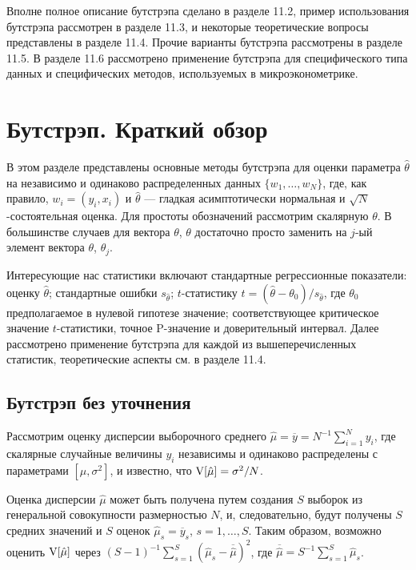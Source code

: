 Вполне полное описание бутстрэпа сделано в разделе 11.2, пример использования бутстрэпа рассмотрен в разделе 11.3, и некоторые теоретические вопросы представлены в разделе 11.4. Прочие варианты бутстрэпа рассмотрены в разделе 11.5. В разделе 11.6 рассмотрено применение бутстрэпа для специфического типа данных и специфических методов, используемых в микроэконометрике.
 
\section{Бутстрэп. Краткий обзор}

В этом разделе представлены основные методы бутстрэпа для оценки параметра $\hat{\theta}$ на независимо и одинаково распределенных данных $\{w_1, \ldots, w_N \}$, где, как правило, $w_i=(y_i,x_i)$ и $\hat{\theta}$ --- гладкая асимптотически нормальная и $\sqrt{N}$-состоятельная оценка. Для простоты обозначений рассмотрим скалярную $\theta$. В большинстве случаев для вектора $\theta$, $\theta$ достаточно просто заменить на $j$-ый элемент вектора $\theta$, $\theta_j$.

Интересующие нас статистики включают стандартные регрессионные показатели: оценку $\hat{\theta}$; стандартные ошибки $s_{\hat{\theta}}$; $t$-статистику $t=(\hat{\theta}-\theta_0)/s_{\hat{\theta}}$, где $\theta_0$ предполагаемое в нулевой гипотезе значение; соответствующее критическое значение $t$-статистики, точное P-значение и доверительный интервал. Далее рассмотрено применение бутстрэпа для каждой из вышеперечисленных статистик, теоретические аспекты см. в разделе 11.4.

\subsection{Бутстрэп без уточнения}

Рассмотрим оценку дисперсии выборочного среднего $\hat{\mu}=\overline{y}=N^{-1}\sum^{N}_{i=1}y_i$, где скалярные случайные величины $y_i$ независимы и одинаково распределены с параметрами $[\mu, \sigma^2]$, и известно, что $\mathrm{V}[\hat{\mu}]=\sigma^2/N$.

Оценка дисперсии $\hat{\mu}$ может быть получена путем создания $S$ выборок из генеральной совокупности размерностью $N$, и, следовательно, будут получены $S$ средних значений и $S$ оценок $\hat{\mu}_s=\overline{y}_s$, $s = 1,\ldots, S$. Таким образом, возможно оценить $\mathrm{V}[\hat{\mu}]$ через $(S - 1)^{-1}\sum^{S}_{s=1}(\hat{\mu}_s - \overline{\hat{\mu}})^2$, где $\overline{\hat{\mu}} = S^{-1}\sum^{S}_{s=1}\hat{\mu}_s$.

